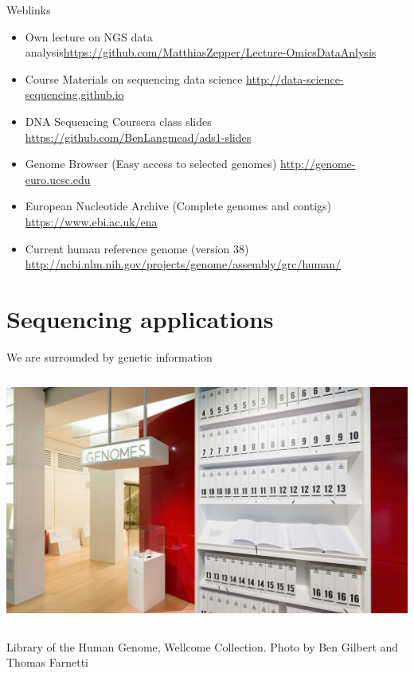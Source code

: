 \documentclass[10pt]{beamer}
\newcommand{\credit}[1]{{\vspace{\fill} \par \raggedleft \scriptsize \mdseries \color{mDarkBrown} #1 \par}}
\begin{document}
\begin{frame}{Weblinks}
	\begin{itemize}
		\item Own lecture on NGS data analysis\linebreak \url{https://github.com/MatthiasZepper/Lecture-OmicsDataAnlysis}
		\item Course Materials on sequencing data science \linebreak \url{http://data-science-sequencing.github.io}
		\item DNA Sequencing Coursera class slides \linebreak \url{https://github.com/BenLangmead/ads1-slides}
		\item Genome Browser (Easy access to selected genomes) \linebreak \url{http://genome-euro.ucsc.edu}
		\item European Nucleotide Archive (Complete genomes and contigs) \linebreak \url{https://www.ebi.ac.uk/ena}
		\item Current human reference genome (version 38) \linebreak \url{http://ncbi.nlm.nih.gov/projects/genome/assembly/grc/human/}
	\end{itemize}
\end{frame}





\section{Sequencing applications}


\begin{frame}{We are surrounded by genetic information}
	\begin{columns}[T]
		\column{\dimexpr\paperwidth-10pt}
		\includegraphics[width=\textwidth]{./figures/WellcomeCollectionGenome.jpg}
	\end{columns}
\credit{Library of the Human Genome, Wellcome Collection. Photo by Ben Gilbert and Thomas Farnetti}
\end{frame}
\end{document}
